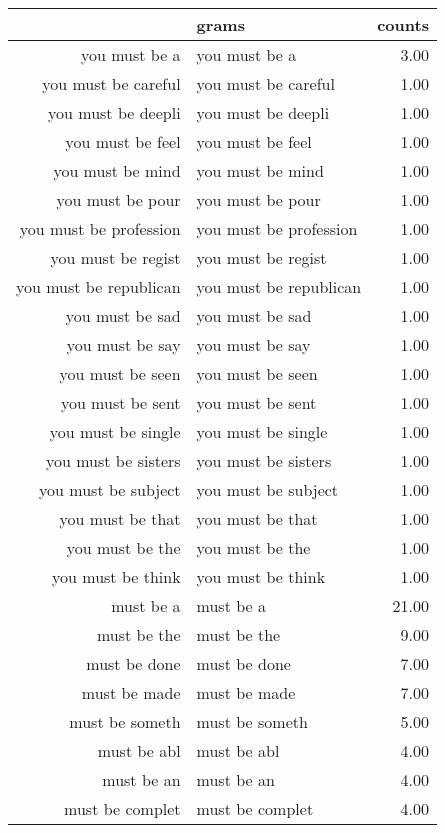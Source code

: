 \begin{table}[ht]
\centering
\begin{tabular}{rlr}
  \hline
 & grams & counts \\ 
  \hline
you must be a & you must be a & 3.00 \\ 
  you must be careful & you must be careful & 1.00 \\ 
  you must be deepli & you must be deepli & 1.00 \\ 
  you must be feel & you must be feel & 1.00 \\ 
  you must be mind & you must be mind & 1.00 \\ 
  you must be pour & you must be pour & 1.00 \\ 
  you must be profession & you must be profession & 1.00 \\ 
  you must be regist & you must be regist & 1.00 \\ 
  you must be republican & you must be republican & 1.00 \\ 
  you must be sad & you must be sad & 1.00 \\ 
  you must be say & you must be say & 1.00 \\ 
  you must be seen & you must be seen & 1.00 \\ 
  you must be sent & you must be sent & 1.00 \\ 
  you must be single & you must be single & 1.00 \\ 
  you must be sisters & you must be sisters & 1.00 \\ 
  you must be subject & you must be subject & 1.00 \\ 
  you must be that & you must be that & 1.00 \\ 
  you must be the & you must be the & 1.00 \\ 
  you must be think & you must be think & 1.00 \\ 
  must be a & must be a & 21.00 \\ 
  must be the & must be the & 9.00 \\ 
  must be done & must be done & 7.00 \\ 
  must be made & must be made & 7.00 \\ 
  must be someth & must be someth & 5.00 \\ 
  must be abl & must be abl & 4.00 \\ 
  must be an & must be an & 4.00 \\ 
  must be complet & must be complet & 4.00 \\ 

\end{tabular}
\end{table}

